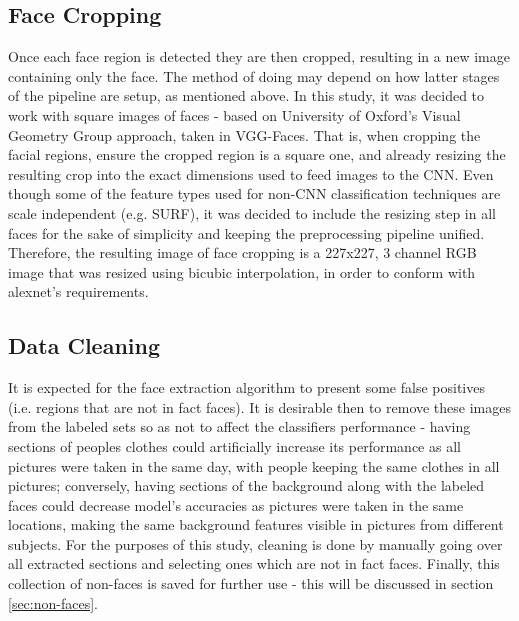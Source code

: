 \documentclass[11pt]{article}
\begin{document}
        \subsection{Face Cropping}
            Once each face region is detected they are then cropped, resulting in a new image containing only the face. The method of doing may depend on how latter stages of the pipeline are setup, as mentioned above. In this study, it was decided to work with square images of faces - based on University of Oxford's Visual Geometry Group approach, taken in VGG-Faces. That is, when cropping the facial regions, ensure the cropped region is a square one, and already resizing the resulting crop into the exact dimensions used to feed images to the CNN. Even though some of the feature types used for non-CNN classification techniques are scale independent (e.g. SURF), it was decided to include the resizing step in all faces for the sake of simplicity and keeping the preprocessing pipeline unified. Therefore, the resulting image of face cropping is a 227x227, 3 channel RGB image that was resized using bicubic interpolation, in order to conform with alexnet's requirements.

        \subsection{Data Cleaning}
            It is expected for the face extraction algorithm to present some false positives (i.e. regions that are not in fact faces). It is desirable then to remove these images from the labeled sets so as not to affect the classifiers performance - having sections of peoples clothes could artificially increase its performance as all pictures were taken in the same day, with people keeping the same clothes in all pictures; conversely, having sections of the background along with the labeled faces could decrease model's accuracies as pictures were taken in the same locations, making the same background features visible in pictures from different subjects. For the purposes of this study, cleaning is done by manually going over all extracted sections and selecting ones which are not in fact faces. Finally, this collection of non-faces is saved for further use - this will be discussed in section \ref{sec:non-faces}.
\end{document}
